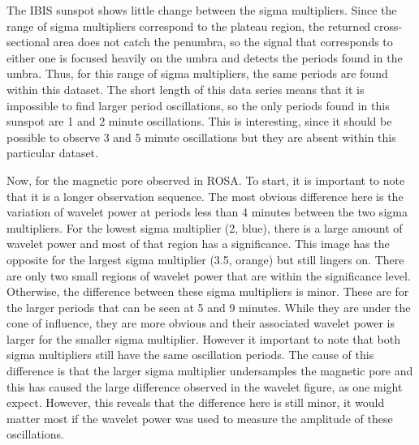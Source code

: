     The IBIS sunspot shows little change between the sigma multipliers.
    Since the range of sigma multipliers correspond to the plateau region, the returned cross-sectional area does not catch the penumbra, so the signal that corresponds to either one is focused heavily on the umbra and detects the periods found in the umbra.
    Thus, for this range of sigma multipliers, the same periods are found within this dataset.
    The short length of this data series means that it is impossible to find larger period oscillations, so the only periods found in this sunspot are 1 and 2 minute oscillations.
    This is interesting, since it should be possible to observe 3 and 5 minute oscillations but they are absent within this particular dataset.
       
    Now, for the magnetic pore observed in ROSA.
    To start, it is important to note that it is a longer observation sequence.
    The most obvious difference here is the variation of wavelet power at periods less than 4 minutes between the two sigma multipliers. 
    For the lowest sigma multiplier (2, blue), there is a large amount of wavelet power and most of that region has a significance. 
    This image has the opposite for the largest sigma multiplier (3.5, orange) but still lingers on.
    There are only two small regions of wavelet power that are within the significance level.
    Otherwise, the difference between these sigma multipliers is minor.
    These are for the larger periods that can be seen at 5 and 9 minutes.
    While they are under the cone of influence, they are more obvious and their associated wavelet power is larger for the smaller sigma multiplier.
    However it important to note that both sigma multipliers still have the same oscillation periods.
    The cause of this difference is that the larger sigma multiplier undersamples the magnetic pore and this has caused the large difference observed in the wavelet figure, as one might expect.
    However, this reveals that the difference here is still minor, it would matter most if the wavelet power was used to measure the amplitude of these oscillations.

